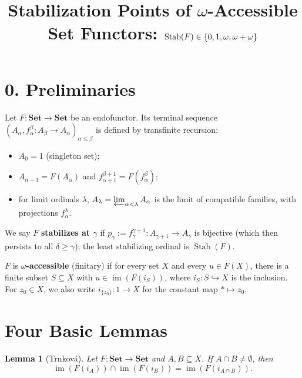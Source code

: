 \documentclass[11pt,a4paper]{article}
\title{Stabilization Points of $\omega$-Accessible Set Functors: $\Stab(F) \in \{0, 1, \omega, \omega + \omega\}$}
\date{}
\theoremstyle{plain}
\newtheorem{lemma}{Lemma}[section]
\newcommand{\Stab}{\operatorname{Stab}}
\newcommand{\im}{\operatorname{im}}
\newcommand{\Set}{\mathbf{Set}}
\begin{document}
\maketitle

\section*{0. Preliminaries}

Let $F : \Set \to \Set$ be an endofunctor. Its terminal sequence $(A_\alpha, f_\alpha^\beta : A_\beta \to A_\alpha)_{\alpha \le \beta}$ is defined by transfinite recursion:
\begin{itemize}[leftmargin=2em]
  \item $A_0 = 1$ (singleton set);
  \item $A_{\alpha+1} = F(A_\alpha)$ and $f_{\alpha+1}^{\beta+1} = F(f_\alpha^\beta)$;
  \item for limit ordinals $\lambda$, $A_\lambda = \varprojlim_{\alpha < \lambda} A_\alpha$ is the limit of compatible families, with projections $f_\alpha^\lambda$.
\end{itemize}
We say $F$ \textbf{stabilizes at $\gamma$} if $p_\gamma := f_\gamma^{\gamma+1} : A_{\gamma+1} \to A_\gamma$ is bijective (which then persists to all $\delta \ge \gamma$); the least stabilizing ordinal is $\Stab(F)$.

$F$ is \textbf{$\omega$-accessible} (finitary) if for every set $X$ and every $u \in F(X)$, there is a finite subset $S \subseteq X$ with $u \in \im(F(i_S))$, where $i_S : S \hookrightarrow X$ is the inclusion. For $z_0 \in X$, we also write $i_{\{z_0\}} : 1 \to X$ for the constant map $* \mapsto z_0$.

\section{Four Basic Lemmas}

\begin{lemma}[Trnková]
Let $F : \Set \to \Set$ and $A, B \subseteq X$. If $A \cap B \neq \emptyset$, then
\[
  \im(F(i_A)) \cap \im(F(i_B)) = \im(F(i_{A \cap B})).
\]
\end{lemma}
\end{document}

